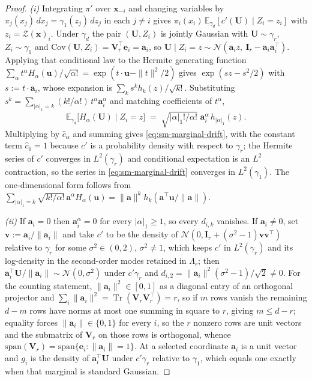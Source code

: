 \documentclass[supplement,review,hidelinks,onefignum,onetabnum]{siamart251216}
\newcommand{\EE}{\mathbb{E}}
\newcommand{\Cov}{\mathrm{Cov}}
\newcommand{\tr}{\operatorname{Tr}}
\newcommand{\gauss}{\gamma}
\newcommand{\mV}{\bm{V}}
\newcommand{\mI}{\bm{I}}
\newcommand{\vx}{\bm{x}}
\newcommand{\vu}{\bm{u}}
\newcommand{\vU}{\bm{U}}
\newcommand{\vv}{\bm{v}}
\newcommand{\scZ}{\mathcal{Z}}
\newcommand{\va}{\bm{a}}
\newcommand{\ve}{\bm{e}}
\begin{document}
\begin{proof}
\emph{(i)} Integrating $\pi'$ over $\vx_{-i}$ and changing variables by $\pi_j(x_j)\,dx_j = \gauss_1(z_j)\,dz_j$ in each $j \neq i$ gives $\pi_i(x_i)\,\EE_{\gauss_d}[c'(\vU)\mid Z_i = z_i]$ with $z_i = \scZ(\vx)_i$. Under $\gauss_d$ the pair $(\vU, Z_i)$ is jointly Gaussian with $\vU\sim\gauss_r$, $Z_i\sim\gauss_1$ and $\Cov(\vU, Z_i) = \mV_r^\top\ve_i = \va_i$, so $\vU \mid Z_i = z \sim \mathcal N(\va_i z,\ \mI_r - \va_i\va_i^\top)$. Applying that conditional law to the Hermite generating function $\sum_\alpha t^\alpha H_\alpha(\vu)/\sqrt{\alpha!} = \exp(t\cdot\vu - \|t\|^2/2)$ gives $\exp(sz - s^2/2)$ with $s := t\cdot\va_i$, whose expansion is $\sum_k s^k h_k(z)/\sqrt{k!}$. Substituting $s^k = \sum_{|\alpha|_1=k}(k!/\alpha!)\,t^\alpha\va_i^\alpha$ and matching coefficients of $t^\alpha$,
\begin{equation}
  \EE_{\gauss_d}\bigl[H_\alpha(\vU)\mid Z_i = z\bigr] \;=\; \sqrt{|\alpha|_1!/\alpha!}\;\va_i^{\alpha}\,h_{|\alpha|_1}(z).
  \label{eq:sm-cond-hermite}
\end{equation}
Multiplying by $\widehat c_\alpha$ and summing gives \eqref{eq:sm-marginal-drift}, with the constant term $\widehat c_0 = 1$ because $c'$ is a probability density with respect to $\gauss_r$; the Hermite series of $c'$ converges in $L^2(\gauss_r)$ and conditional expectation is an $L^2$ contraction, so the series in \eqref{eq:sm-marginal-drift} converges in $L^2(\gauss_1)$. The one-dimensional form follows from $\sum_{|\alpha|_1=k}\sqrt{k!/\alpha!}\,\va^\alpha H_\alpha(\vu) = \|\va\|^k h_k(\va^\top\vu/\|\va\|)$.

\emph{(ii)} If $\va_i = 0$ then $\va_i^\alpha = 0$ for every $|\alpha|_1 \ge 1$, so every $d_{i,k}$ vanishes. If $\va_i \neq 0$, set $\vv := \va_i/\|\va_i\|$ and take $c'$ to be the density of $\mathcal N(0, \mI_r + (\sigma^2-1)\vv\vv^\top)$ relative to $\gauss_r$ for some $\sigma^2 \in (0,2)$, $\sigma^2 \neq 1$, which keeps $c'$ in $L^2(\gauss_r)$ and its log-density in the second-order modes retained in $\Lambda_r$; then $\va_i^\top\vU/\|\va_i\| \sim \mathcal N(0,\sigma^2)$ under $c'\gauss_r$ and $d_{i,2} = \|\va_i\|^2(\sigma^2-1)/\sqrt2 \neq 0$. For the counting statement, $\|\va_i\|^2 \in [0,1]$ as a diagonal entry of an orthogonal projector and $\sum_i\|\va_i\|^2 = \tr(\mV_r\mV_r^\top) = r$, so if $m$ rows vanish the remaining $d-m$ rows have norms at most one summing in square to $r$, giving $m \le d-r$; equality forces $\|\va_i\| \in \{0,1\}$ for every $i$, so the $r$ nonzero rows are unit vectors and the submatrix of $\mV_r$ on those rows is orthogonal, whence $\mathrm{span}(\mV_r) = \mathrm{span}\{\ve_i : \|\va_i\| = 1\}$. At a selected coordinate $\va_i$ is a unit vector and $g_i$ is the density of $\va_i^\top\vU$ under $c'\gauss_r$ relative to $\gauss_1$, which equals one exactly when that marginal is standard Gaussian.


\end{proof}
\end{document}

